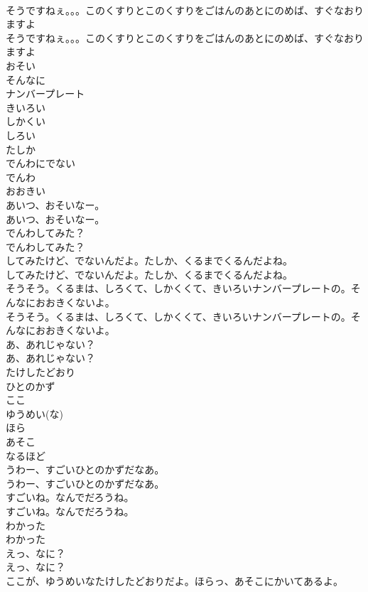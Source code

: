 \documentclass[8pt]{extreport}
\begin{document}
\begin{CJK}{UTF8}{min}
\\	そうですねぇ。。。このくすりとこのくすりをごはんのあとにのめば、すぐなおりますよ
\\	そうですねぇ。。。このくすりとこのくすりをごはんのあとにのめば、すぐなおりますよ
\\	おそい
\\	そんなに
\\	ナンバープレート
\\	きいろい
\\	しかくい
\\	しろい
\\	たしか
\\	でんわにでない
\\	でんわ
\\	おおきい
\\	あいつ、おそいなー。
\\	あいつ、おそいなー。
\\	でんわしてみた？
\\	でんわしてみた？
\\	してみたけど、でないんだよ。たしか、くるまでくるんだよね。
\\	してみたけど、でないんだよ。たしか、くるまでくるんだよね。
\\	そうそう。くるまは、しろくて、しかくくて、きいろいナンバープレートの。そんなにおおきくないよ。
\\	そうそう。くるまは、しろくて、しかくくて、きいろいナンバープレートの。そんなにおおきくないよ。
\\	あ、あれじゃない？
\\	あ、あれじゃない？
\\	たけしたどおり
\\	ひとのかず
\\	ここ
\\	ゆうめい(な)
\\	ほら
\\	あそこ
\\	なるほど
\\	うわー、すごいひとのかずだなあ。
\\	うわー、すごいひとのかずだなあ。
\\	すごいね。なんでだろうね。
\\	すごいね。なんでだろうね。
\\	わかった
\\	わかった
\\	えっ、なに？
\\	えっ、なに？
\\	ここが、ゆうめいなたけしたどおりだよ。ほらっ、あそこにかいてあるよ。

\end{CJK}
\end{document}
